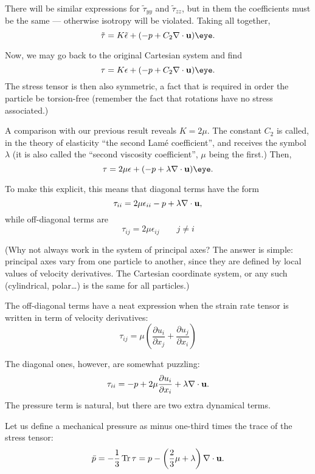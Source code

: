 There will be similar expressions for $\tilde{\tau}_{yy}$ and
$\tilde{\tau}_{zz}$, but in them the coefficients must be the same ---
otherwise isotropy will be violated. Taking all together,
\[
\tilde{\tau}=
K \tilde{\epsilon}
+ ( - p + C_2 \nabla\cdot \bfu ) \eye.
\]

Now, we may go back to the original Cartesian system and find
\[
\tau=
K \epsilon
+ ( - p + C_2 \nabla\cdot \bfu ) \eye.
\]
The stress tensor is then also symmetric, a fact that is required in
order the particle be torsion-free (remember the fact that rotations
have no stress associated.)

A comparison with our previous result reveals $K=2\mu$. The constant
$C_2$ is called, in the theory of elasticity ``the second Lam\'e
coefficient'', and receives the symbol $\lambda$ (it is also called
the ``second viscosity coefficient'', $\mu$ being the first.) Then,
\[
\tau=
2 \mu \epsilon + ( - p + \lambda \nabla\cdot \bfu ) \eye.
\]

To make this explicit, this means that diagonal terms have the form
\begin{equation}
  \label{eq:tau_diagonal}
  \tau_{ii}=
  2 \mu \epsilon_{ii}  - p + \lambda \nabla\cdot \mathbf{u} ,
\end{equation}
while off-diagonal terms are
\begin{equation}
  \label{eq:tau_off_diagonal}
  \tau_{ij}=  2 \mu \epsilon_{ij} \qquad j \ne i
\end{equation}


(Why not always work in the system of principal axes? The answer is
simple: principal axes vary from one particle to another, since they
are defined by local values of velocity derivatives. The Cartesian
coordinate system, or any such (cylindrical, polar\ldots) is the same
for all particles.)

The off-diagonal terms have a neat expression when the strain rate
tensor is written in term of velocity derivatives:
\[
\tau_{ij}=
\mu
\left(
\frac{\partial u_i}{\partial x_j} +
\frac{\partial u_j}{\partial x_i}
\right)
\]

The diagonal ones, however, are somewhat puzzling:
\[
\tau_{ii}=
- p +
2 \mu \frac{\partial u_i}{\partial x_i}  + \lambda \nabla\cdot \mathbf{u} .
\]
The pressure term is natural, but there are two extra dynamical terms.

Let us define a mechanical pressure as minus one-third times the trace
of the stress tensor:
\[
\bar{p}=
-\frac13 \operatorname{Tr} \tau  = 
 p
- \left( \frac23 \mu  + \lambda \right) \nabla\cdot \mathbf{u} .
\]

